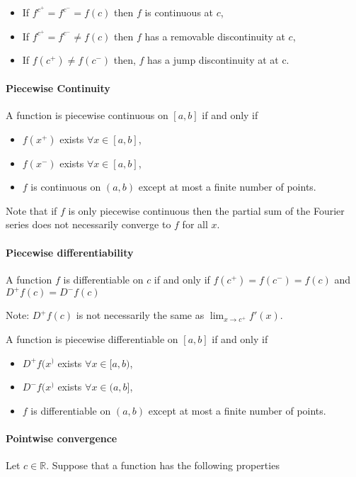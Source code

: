 \documentclass[12pt, letterpaper]{article}
\begin{document}
    \begin{itemize}
        \item If \(f^{c^+} = f^{c^-} = f(c)\) then \(f\) is continuous at \(c\),
        \item If \(f^{c^+} = f^{c^-} \neq f(c)\) then \(f\) has a removable discontinuity at \(c\),
        \item If \(f(c^+) \neq f(c^-)\) then, \(f\) has a jump discontinuity at
        at c.
    \end{itemize}

    \paragraph{Piecewise Continuity}
    A function is piecewise continuous on \([a, b]\) if and only if 
    \begin{itemize}
        \item \(f(x^+)\) exists \(\forall x\in [a, b]\),
        \item \(f(x^-)\) exists \(\forall x\in [a, b]\),
        \item \(f\) is continuous on \((a, b)\) except at most a finite number of points.
    \end{itemize}
    Note that if \(f\) is only piecewise continuous then the partial sum of the Fourier series does not necessarily converge to \(f\) for all \(x\).

    \paragraph{Piecewise differentiability}
    A function \(f\) is differentiable on \(c\) if and only if
    \(f(c^+) = f(c^-) = f(c)\) and \(D^+ f(c) = D^- f(c)\)
    
    Note: \(D^+ f(c)\) is not necessarily the same as \(\lim_{x\to c^+}f'(x)\).

    A function is piecewise differentiable on \([a, b]\) if and only if 
    \begin{itemize}
        \item \(D^+f(x^)\) exists \(\forall x\in [a, b)\),
        \item \(D^-f(x^)\) exists \(\forall x\in (a, b]\),
        \item \(f\) is differentiable on \((a, b)\) except at most a finite number of points.
    \end{itemize}

    \paragraph{Pointwise convergence}
    Let \(c\in \mathbb{R}\). Suppose that a function has the following properties
\end{document}
